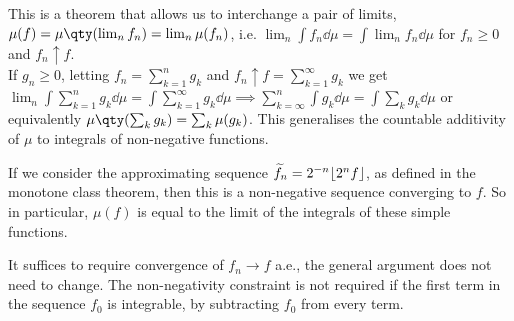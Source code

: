 \begin{remark}
	This is a theorem that allows us to interchange a pair of limits, $\mu(f) = \mu\qty(\lim_n f_n) = \lim_n \mu(f_n)$, i.e. $\lim_n \int f_n \dd{\mu} = \int \lim_n f_n \dd{\mu}$ for $f_n \geq 0$ and $f_n \uparrow f$. \\
	If $g_n \geq 0$, letting $f_n = \sum_{k=1}^{n} g_k$ and $f_n \uparrow f = \sum_{k=1}^{\infty} g_k$ we get $\lim_n \int \sum_{k=1}^{n} g_k \dd{\mu} = \int \sum_{k=1}^\infty g_k \dd{\mu} \implies \sum_{k=\infty}^{n} \int g_k \dd{\mu} = \int \sum_k g_k \dd{\mu}$ or equivalently $\mu\qty(\sum_k g_k) = \sum_k \mu(g_k)$.
	This generalises the countable additivity of $\mu$ to integrals of non-negative functions.

	If we consider the approximating sequence $\widetilde f_n = 2^{-n} \floor*{2^n f}$, as defined in the monotone class theorem, then this is a non-negative sequence converging to $f$.
	So in particular, $\mu(f)$ is equal to the limit of the integrals of these simple functions.

	It suffices to require convergence of $f_n \to f$ a.e., the general argument does not need to change.
	The non-negativity constraint is not required if the first term in the sequence $f_0$ is integrable, by subtracting $f_0$ from every term.
\end{remark}

